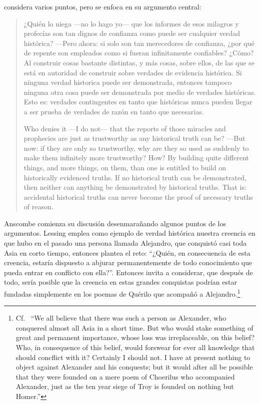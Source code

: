 \begin{enumerate}
  considera varios puntos, pero se enfoca en su argumento central:
  \blockquote[Who denies it ---I do not--- that the reports of those miracles
  and prophecies are just as trustworthy as any historical truth can be? ---But
  now: if they are only so trustworthy, why are they so used as suddenly to make
  them infinitely more trustworthy? How? By building quite different things, and
  more things, on them, than one is entitled to build on historically evidenced
  truths. If no historical truth can be demonstrated, then neither can anything
  be demonstrated by historical truths. That is: accidental historical truths
  can never become the proof of necessary truths of reason.]{¿Quién lo niega
    ---no lo hago yo--- que los informes de esos milagros y profecías son tan
    dignos de confianza como puede ser cualquier verdad histórica? ---Pero
    ahora: si solo son tan merecedores de confianza, ¿por qué de repente son
    empleados como si fueran infinitamente confiables? ¿Cómo? Al construir cosas
    bastante distintas, y más cosas, sobre ellos, de las que se está en
    autoridad de construir sobre verdades de evidencia histórica. Si ninguna
    verdad historica puede ser demonstrada, entonces tampoco ninguna otra cosa
    puede ser demonstrada por medio de verdades históricas. Esto es: verdades
    contingentes en tanto que históricas nunca pueden llegar a ser prueba de
    verdades de razón en tanto que necesarias.}
\end{enumerate}

Anscombe comienza su discusión desenmarañando algunos puntos de los argumentos.
Lessing emplea como ejemplo de verdad histórica nuestra creencia en que hubo en
el pasado una persona llamada Alejandro, que conquistó casi toda Asia en corto
tiempo, entonces plantea el reto: \enquote{¿Quién, en consecuencia de esta
  creencia, estaría dispuesto a abjurar permanentemente de todo conocimiento que
  pueda entrar en conflicto con ella?}. Entonces invita a considerar, que
después de todo, sería posible que la creencia en estas grandes conquistas
podrían estar fundadas simplemente en los poemas de Quérilo que acompañó a
Alejandro.\footnote{Cf.~ \enquote{We all believe that there was such a person as
    Alexander, who conquered almost all Asia in a short time. But who would
    stake something of great and permanent importance, whose loss was
    irreplaceable, on this belief? Who, in consequence of this belief, would
    forswear for ever all knowledge that should concflict with it? Certainly I
    should not. I have at present nothing to object against Alexander and his
    conquests; but it would after all be possible that they were founded on a
    mere poem of Choerilus who accompanied Alexander, just as the ten year siege
    of Troy is founded on nothing but Homer.}}

